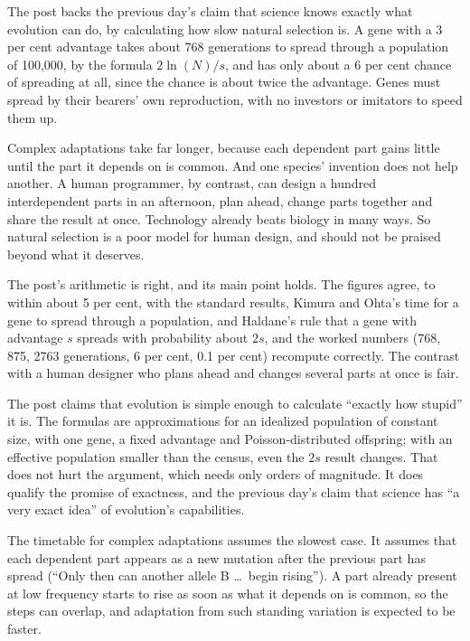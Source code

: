 \begin{afterword}
\summaryhead

The post backs the previous day's claim that science knows exactly what evolution can do, by calculating how slow natural selection is. A gene with a 3 per cent advantage takes about 768 generations to spread through a population of 100,000, by the formula $2\ln(N)/s$, and has only about a 6 per cent chance of spreading at all, since the chance is about twice the advantage. Genes must spread by their bearers' own reproduction, with no investors or imitators to speed them up.

Complex adaptations take far longer, because each dependent part gains little until the part it depends on is common. And one species' invention does not help another. A human programmer, by contrast, can design a hundred interdependent parts in an afternoon, plan ahead, change parts together and share the result at once. Technology already beats biology in many ways. So natural selection is a poor model for human design, and should not be praised beyond what it deserves.

\responsehead

The post's arithmetic is right, and its main point holds. The figures agree, to within about 5 per cent, with the standard results, Kimura and Ohta's time for a gene to spread through a population, and Haldane's rule that a gene with advantage $s$ spreads with probability about $2s$, and the worked numbers (768, 875, 2763 generations, 6 per cent, 0.1 per cent) recompute correctly. The contrast with a human designer who plans ahead and changes several parts at once is fair.

The post claims that evolution is simple enough to calculate ``exactly how stupid'' it is. The formulas are approximations for an idealized population of constant size, with one gene, a fixed advantage and Poisson-distributed offspring; with an effective population smaller than the census, even the $2s$ result changes. That does not hurt the argument, which needs only orders of magnitude. It does qualify the promise of exactness, and the previous day's claim that science has ``a very exact idea'' of evolution's capabilities.

The timetable for complex adaptations assumes the slowest case. It assumes that each dependent part appears as a new mutation after the previous part has spread (``Only then can another allele B \ldots\ begin rising''). A part already present at low frequency starts to rise as soon as what it depends on is common, so the steps can overlap, and adaptation from such standing variation is expected to be faster.


\end{afterword}
